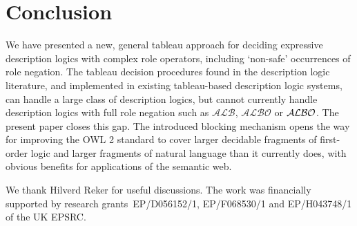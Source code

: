 \documentclass[leqno
,pdflatex
,prodmode
,acmtocl
]{acmsmall}
\newcommand{\mathcmd}[1]{\ensuremath{#1}\xspace}
\newcommand{\dlfont}{\mathcal}
\newcommand{\dl}[1]{\mathcmd{\dlfont{#1}}}
\newcommand{\ALBOid}{\dl{ALBO\smash[t]{\mbox{}}}}
\newcommand{\ALB}{\dl{ALB}}
\newcommand{\ALBO}{\dl{ALBO}}
\begin{document}
\section{Conclusion}

We have presented a new, general tableau approach for deciding
expressive description logics with complex role operators, including 
`non-safe' occurrences of role negation.
The tableau decision procedures found in the description logic
literature, and implemented in existing tableau-based description
logic systems, can handle a large class of description logics, but
cannot currently handle description logics with full role negation
such as \ALB, \ALBO or \ALBOid.
The present paper closes this gap.
The introduced blocking mechanism opens the way for improving the OWL 2 standard
to cover larger decidable fragments of first-order logic and larger fragments of natural language
than it currently does, with obvious benefits for applications of
the semantic web.

\begin{acks}
We thank Hilverd Reker for useful discussions.
The work was financially supported by research grants~EP/D056152/1, EP/F068530/1
and
EP/H043748/1 of the UK EPSRC.
\end{acks}
\end{document}
